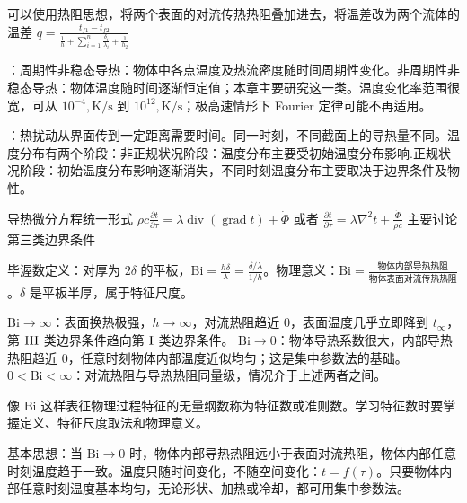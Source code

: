 可以使用热阻思想，将两个表面的对流传热热阻叠加进去，将温差改为两个流体的温差 $q = \frac{t_{f1}-t_{f2}}{\frac{1}{h}+\sum_{i=1}^{n}\frac{\delta_i}{\lambda_i}+\frac{1}{h_2}}$

\divider


：周期性非稳态导热：物体中各点温度及热流密度随时间周期性变化。非周期性非稳态导热：物体温度随时间逐渐恒定值；本章主要研究这一类。温度变化率范围很宽，可从 $10^{-4},\mathrm{K/s}$ 到 $10^{12},\mathrm{K/s}$；极高速情形下 Fourier 定律可能不再适用。

：热扰动从界面传到一定距离需要时间。同一时刻，不同截面上的导热量不同。温度分布有两个阶段：非正规状况阶段：温度分布主要受初始温度分布影响.正规状况阶段：初始温度分布影响逐渐消失，不同时刻温度分布主要取决于边界条件及物性。

导热微分方程统一形式 $\rho c \frac{\partial t}{\partial \tau}=\lambda \operatorname{div}(\operatorname{grad}t)+\dot{\Phi}$ 或者 $\frac{\partial t}{\partial \tau}=\lambda\nabla^2t+\frac{\dot{\Phi}}{\rho c}$ 主要讨论第三类边界条件

毕渥数定义：对厚为 $2\delta$ 的平板，$\mathrm{Bi}=\frac{h\delta}{\lambda}=\frac{\delta/\lambda}{1/h}$。物理意义：$\mathrm{Bi}=\frac{\text{物体内部导热热阻}}{\text{物体表面对流传热热阻}}$。$\delta$ 是平板半厚，属于特征尺度。

$\mathrm{Bi}\to\infty$：表面换热极强，$h\to\infty$，对流热阻趋近 0，表面温度几乎立即降到 $t_\infty$，第 $\MRN{3}$  类边界条件趋向第 $\MRN{1}$  类边界条件。
$\mathrm{Bi}\to 0$：物体导热系数很大，内部导热热阻趋近 $0$，任意时刻物体内部温度近似均匀；这是集中参数法的基础。
$0<\mathrm{Bi}<\infty$：对流热阻与导热热阻同量级，情况介于上述两者之间。

像 $\mathrm{Bi}$ 这样表征物理过程特征的无量纲数称为特征数或准则数。学习特征数时要掌握定义、特征尺度取法和物理意义。

\divider


基本思想：当 $\mathrm{Bi}\to 0$ 时，物体内部导热热阻远小于表面对流热阻，物体内部任意时刻温度趋于一致。温度只随时间变化，不随空间变化：$t=f(\tau)$。只要物体内部任意时刻温度基本均匀，无论形状、加热或冷却，都可用集中参数法。

